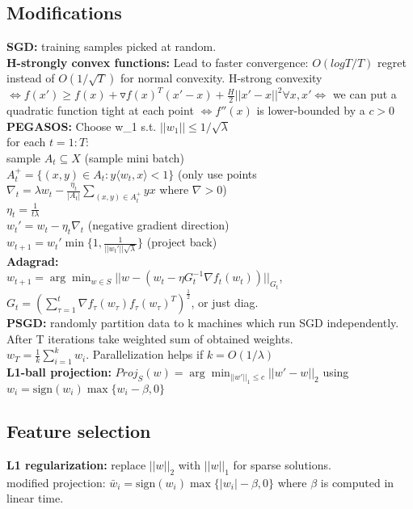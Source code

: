 \subsection*{Modifications} %
\textbf{SGD:} training samples picked at random.\\
\textbf{H-strongly convex functions:} Lead to faster convergence: $O(logT/T)$ regret instead of $O(1/\sqrt{T})$ for normal convexity. H-strong convexity $\Leftrightarrow f(x') \geq f(x) + \triangledown f(x)^T(x'-x)+\frac{H}{2}||x'-x||^2 \forall x,x' \Leftrightarrow$ we can put a quadratic function tight at each point $\Leftrightarrow f''(x)$ is lower-bounded by a $c > 0$\\
\textbf{PEGASOS:} Choose w_1 s.t. $||w_1|| \leq 1/\sqrt{\lambda}$ \\
for each $t = 1:T$:\\
sample $A_t \subseteq X$ (sample mini batch)\\
$A_t^+ = \{(x, y) \in A_t: y\langle w_t,x\rangle < 1\}$ (only use points \\
$ \nabla_t = \lambda w_t - \frac{\eta_t}{|A_t|}\sum_{(x,y) \in A_t^+}yx$ \qquad where $\nabla>0$)\\
$\eta_t = \frac{1}{t\lambda}$\\
$w_t' = w_t - \eta_t\nabla_t$ (negative gradient direction)\\
$w_{t+1} = w_t' \min\{1,\frac{1}{||w_t'||\sqrt{\lambda}}\}$ (project back)\\
\textbf{Adagrad:}\\
$w_{t+1} = \arg \min_{w\in S}||w - (w_t - \eta G_t^{-1}\nabla f_t(w_t))||_{G_t}$, $G_t = (\sum_{\tau=1}^{t}\nabla f_{\tau}(w_{\tau})f_{\tau}(w_{\tau})^T)^{\frac{1}{2}}$, or just diag.\\
\textbf{PSGD:} randomly partition data to k machines which run SGD independently.  After T iterations take weighted sum of obtained weights.\\
$w_T = \frac{1}{k} \sum_{i=1}^k w_i$.  Parallelization helps if $k = O(1/\lambda)$\\
\textbf{L1-ball projection: } $Proj_S(w) = \arg\min_{||w'||_1\leq c}||w'-w||_2$ using $w_i=\mathrm{sign}(w_i)\max\{w_i-\beta,0\}$

\subsection*{Feature selection} 
\textbf{L1 regularization:} replace $||w||_2$ with $||w||_1$ for sparse solutions. \\
modified projection: $\bar{w}_i = \mathrm{sign}(w_i) \max\{|w_i|-\beta,0\}$ where $\beta$ is computed in linear time.


